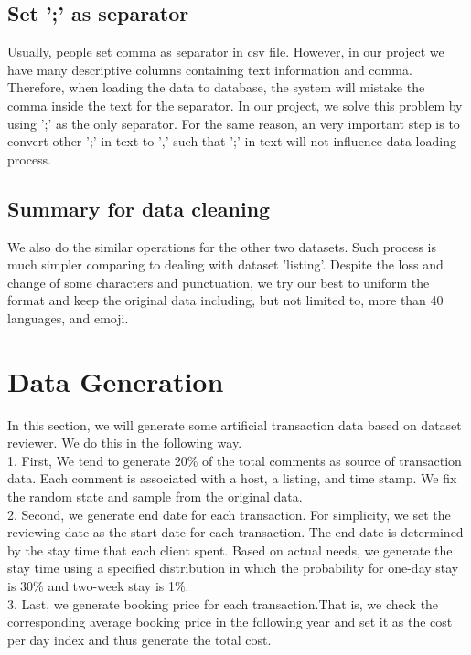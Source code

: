 \documentclass{article}
\begin{document}
	\subsection{Set ';' as separator}
	Usually, people set comma as separator in csv file. However, in our project we have many descriptive columns containing text information and comma. Therefore, when loading the data to database, the system will mistake the comma inside the text for the separator. 
	\noindent In our project, we solve this problem by using ';' as the only separator. For the same reason, an very important step is to convert other ';' in text to ',' such that ';' in text will not influence data loading process.
	
	\subsection{Summary for data cleaning}
	We also do the similar operations for the other two datasets. Such process is much simpler comparing to dealing with dataset 'listing'. Despite the loss and change of some characters and punctuation, we try our best to uniform the format and keep the original data including, but not limited to, more than 40 languages, and emoji. 
	
	
	\section{Data Generation}
	In this section, we will generate some artificial transaction data based on dataset reviewer. We do this in the following way.
	\vspace{3pt}
	\\
	1. First, We tend to generate 20\% of the total comments as source of transaction data. Each comment is associated with a host, a listing, and time stamp. We fix the random state and sample from the original data. 
	\\
	2. Second, we generate end date for each transaction. For simplicity, we set the reviewing date as the start date for each transaction. The end date is determined by the stay time that each client spent. Based on actual needs, we generate the stay time using a specified distribution in which the probability for one-day stay is 30\% and two-week stay is 1\%.
	\\
	3. Last, we generate booking price for each transaction.That is, we check the corresponding average booking price in the following year and set it as the cost per day index and thus generate the total cost. 
	
\end{document}
